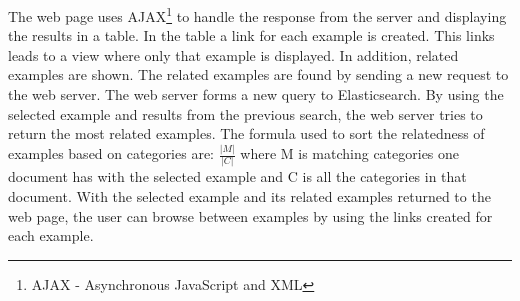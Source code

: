 The web page uses AJAX\footnote{AJAX - Asynchronous JavaScript and XML} to handle the response from the server and displaying the results in a table. In the table a link for each example is created. This links leads to a view where only that example is displayed. In addition, related examples are shown. The related examples are found by sending a new request to the web server. The web server forms a new query to Elasticsearch. By using the selected example and results from the previous search, the web server tries to return the most related examples. The formula used to sort the relatedness of examples based on categories are: \(\frac{|M|}{|C|}\) where M is matching categories one document has with the selected example and C is all the categories in that document.
With the selected example and its related examples returned to the web page, the user can browse between examples by using the links created for each example.

\cleardoublepage